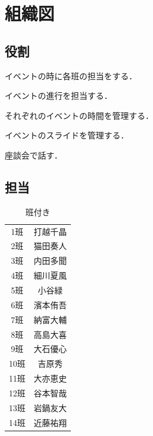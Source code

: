 \chapter{組織図}

\section{役割}
\begin{description}[labelwidth=6em]
  \item[班付き] イベントの時に各班の担当をする．
  \item[司会] イベントの進行を担当する．
  \item[タイムキーパー] それぞれのイベントの時間を管理する．
  \item[スライド管理] イベントのスライドを管理する．
  \item[座談会担当] 座談会で話す．
\end{description}

\section{担当}
\begin{table}[h]
  \centering
  \caption{班付き}
  \begin{tabular}{cc}
    \hline
    1班 & 打越千晶 \\
    2班 & 猫田奏人 \\
    3班 & 内田多聞 \\
    4班 & 細川夏風 \\
    5班 & 小谷緑 \\
    6班 & 濱本侑吾 \\
    7班 & 納富大輔 \\
    8班 & 高島大喜 \\
    9班 & 大石優心 \\
    10班 & 吉原秀 \\
    11班 & 大亦恵史 \\
    12班 & 谷本智哉 \\
    13班 & 岩鍋友大 \\
    14班 & 近藤祐翔 \\
    \hline
  \end{tabular}

\end{table}

